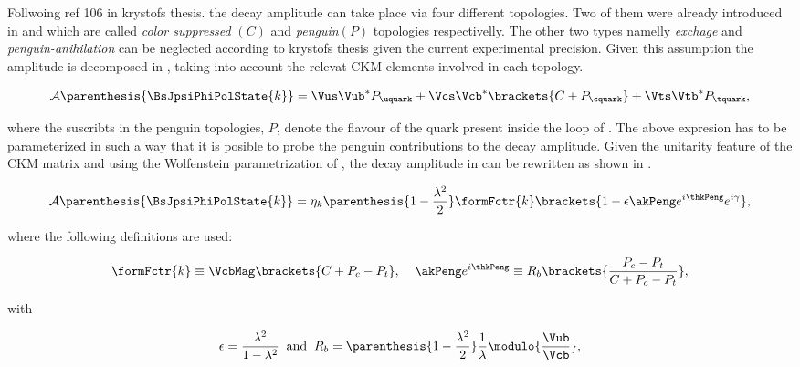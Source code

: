 


Follwoing {\color{red} ref 106 in krystofs thesis.} the \BsJpsiPhi decay amplitude can take place via four different topologies.
Two of them were already introduced in  and  which are called {\it color suppressed }$(C)$ and {\it penguin}$(P)$
topologies respectivelly. The other two types namelly {\it exchage} and {\it penguin-anihilation} can be neglected according to {\color{red} krystofs thesis}
given the current experimental precision. Given this assumption the \BsJpsiPhi amplitude is decomposed in , taking into account the
relevat CKM elements involved in each topology.

\begin{equation}
\mathcal{A} \parenthesis{\BsJpsiPhiPolState{k}} = \Vus\Vub^*P_{\uquark} + \Vcs\Vcb^*\brackets{C +P_{\cquark}} + \Vts\Vtb^*P_{\tquark},
 \label{bsjpsiphi_amp}
\end{equation}

\noindent where the suscribts in the penguin topologies, $P$, denote the flavour of the quark present inside the loop of .
The above expresion has to be parameterized in such a way that it is posible to probe the penguin contributions to
the \BsJpsiPhi decay amplitude. Given the unitarity feature of the CKM matrix and using the Wolfenstein parametrization of ,
the decay amplitude in  can be rewritten as shown in .

\begin{equation}
  \mathcal{A} \parenthesis{\BsJpsiPhiPolState{k}} = \eta_k  \parenthesis{1-\frac{\lambda^2}{2}} \formFctr{k} \brackets{ 1 - \epsilon \akPeng e^{i\thkPeng} e^{i\gamma} },
 \label{bsjpsiphi_amp_param}
\end{equation}

\noindent where the following definitions are used:

\begin{equation}
  \formFctr{k} \equiv \VcbMag \brackets{C + P_c - P_t}, \;\;\;\; \akPeng e^{i\thkPeng} \equiv R_b \brackets{ \frac{P_c - P_t}{C + P_c - P_t} },
  \label{bsjpsiphi_amp_param_defs}
\end{equation}

\noindent with

\begin{equation}
  \epsilon = \frac{\lambda^2}{1-\lambda^2} \;\;\text{and} \;\;  R_b = \parenthesis{1-\frac{\lambda^2}{2}} \frac{1}{\lambda} \modulo{\frac{\Vub}{\Vcb}},
  \label{bsjpsiphi_amp_param_defs_II}
\end{equation}


